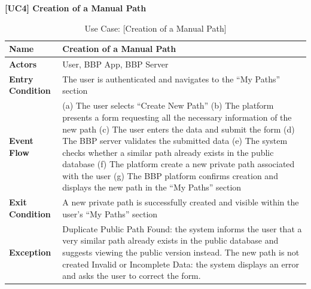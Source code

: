\begin{table}[H]
    \centering
     \raggedright \textbf{\large [UC4] Creation of a Manual Path} \\[0.2cm]
   
    \renewcommand{\arraystretch}{1.5}
    
    \begin{tabularx}{\textwidth}{|l|X|}
        \hline
        
        \textbf{Name} & \textbf{Creation of a Manual Path} \\ \hline
        
        \textbf{Actors} & User, BBP App, BBP Server \\ \hline
        
        \textbf{Entry Condition} & The user is authenticated and navigates to the “My Paths” section \\ \hline
        
        \textbf{Event Flow} & 
        (a) The user selects “Create New Path” \newline
        (b) The platform presents a form requesting  all the necessary information of the new path \newline
        (c) The user enters the data and submit the form \newline
        (d) The BBP server validates the submitted data \newline
        (e) The system checks whether a similar path already exists in the public database \newline                 
        (f) The platform create a new private path associated with the user \newline
        (g) The BBP platform confirms creation and displays the new path in the “My Paths” section
        \\ \hline
        
        \textbf{Exit Condition} & A new private path is successfully created and visible within the user’s “My Paths” section \\ \hline
        
        \textbf{Exception} & Duplicate Public Path Found: the system informs the user that a very similar path already exists in the public database and suggests viewing the public version instead. The new path is not created \newline                                 
        Invalid or Incomplete Data: the system displays an error and asks the user to correct the form. \\ \hline
        
    \end{tabularx}
    
    \caption{Use Case: [Creation of a Manual Path]}
    \label{tab:usecase_id}
\end{table}

